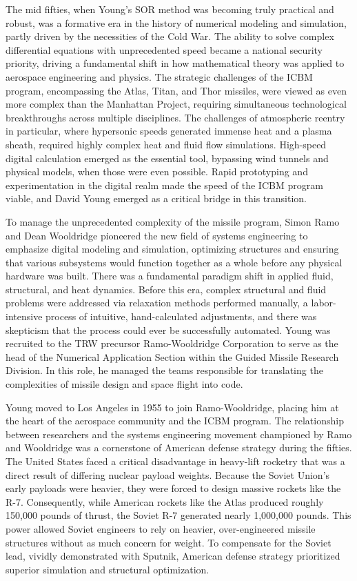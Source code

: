 The mid fifties, when Young’s SOR method was becoming truly practical and robust, was a formative era in the history of numerical modeling and simulation, partly driven by the necessities of the Cold War. The ability to solve complex differential equations with unprecedented speed became a national security priority, driving a fundamental shift in how mathematical theory was applied to aerospace engineering and physics. The strategic challenges of the ICBM program, encompassing the Atlas, Titan, and Thor missiles, were viewed as even more complex than the Manhattan Project, requiring simultaneous technological breakthroughs across multiple disciplines. The challenges of atmospheric reentry in particular, where hypersonic speeds generated immense heat and a plasma sheath, required highly complex heat and fluid flow simulations. High-speed digital calculation emerged as the essential tool, bypassing wind tunnels and physical models, when those were even possible. Rapid prototyping and experimentation in the digital realm made the speed of the ICBM program viable, and David Young emerged as a critical bridge in this transition. 

To manage the unprecedented complexity of the missile program, Simon Ramo and Dean Wooldridge pioneered the new field of systems engineering to emphasize digital modeling and simulation, optimizing structures and ensuring that various subsystems would function together as a whole before any physical hardware was built. There was a fundamental paradigm shift in applied fluid, structural, and heat dynamics. Before this era, complex structural and fluid problems were addressed via relaxation methods performed manually, a labor-intensive process of intuitive, hand-calculated adjustments, and there was skepticism that the process could ever be successfully automated. Young was recruited to the TRW precursor Ramo-Wooldridge Corporation to serve as the head of the Numerical Application Section within the Guided Missile Research Division. In this role, he managed the teams responsible for translating the complexities of missile design and space flight into code. 

Young moved to Los Angeles in 1955 to join Ramo-Wooldridge, placing him at the heart of the aerospace community and the ICBM program. The relationship between researchers and the systems engineering movement championed by Ramo and Wooldridge was a cornerstone of American defense strategy during the fifties. The United States faced a critical disadvantage in heavy-lift rocketry that was a direct result of differing nuclear payload weights. Because the Soviet Union's early payloads were heavier, they were forced to design massive rockets like the R-7. Consequently, while American rockets like the Atlas produced roughly 150,000 pounds of thrust, the Soviet R-7 generated nearly 1,000,000 pounds. This power allowed Soviet engineers to rely on heavier, over-engineered missile structures without as much concern for weight. To compensate for the Soviet lead, vividly demonstrated with Sputnik, American defense strategy prioritized superior simulation and structural optimization. 

